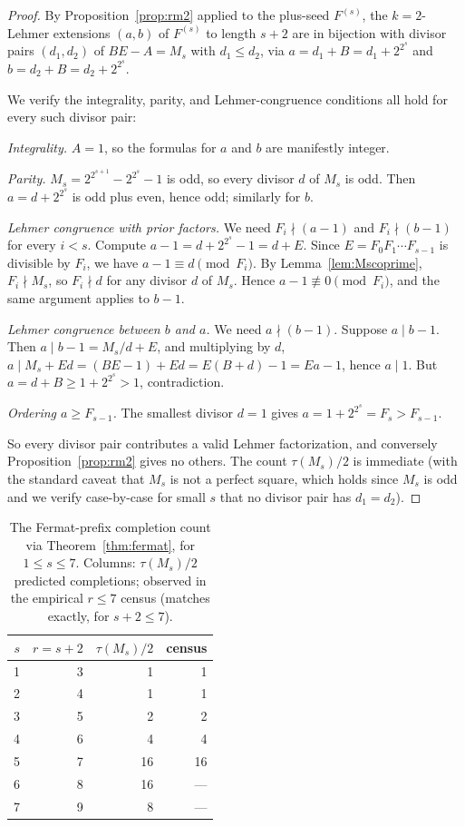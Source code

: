 \documentclass[11pt]{article}
\theoremstyle{definition}
\theoremstyle{remark}
\begin{document}
\begin{proof}
By Proposition~\ref{prop:rm2} applied to the plus-seed $F^{(s)}$, the
$k = 2$-Lehmer extensions $(a, b)$ of $F^{(s)}$ to length $s + 2$ are
in bijection with divisor pairs $(d_1, d_2)$ of $BE - A = M_s$ with
$d_1 \le d_2$, via $a = d_1 + B = d_1 + 2^{2^s}$ and
$b = d_2 + B = d_2 + 2^{2^s}$.

We verify the integrality, parity, and Lehmer-congruence conditions
all hold for every such divisor pair:

\emph{Integrality.}  $A = 1$, so the formulas for $a$ and $b$ are
manifestly integer.

\emph{Parity.}  $M_s = 2^{2^{s+1}} - 2^{2^s} - 1$ is odd, so every
divisor $d$ of $M_s$ is odd.  Then $a = d + 2^{2^s}$ is odd plus
even, hence odd; similarly for $b$.

\emph{Lehmer congruence with prior factors.}  We need $F_i \nmid (a -
1)$ and $F_i \nmid (b - 1)$ for every $i < s$.  Compute
$a - 1 = d + 2^{2^s} - 1 = d + E$.  Since $E = F_0 F_1 \cdots F_{s-1}$
is divisible by $F_i$, we have $a - 1 \equiv d \pmod{F_i}$.  By
Lemma~\ref{lem:Mscoprime}, $F_i \nmid M_s$, so $F_i \nmid d$ for any
divisor $d$ of $M_s$.  Hence $a - 1 \not\equiv 0 \pmod{F_i}$, and
the same argument applies to $b - 1$.

\emph{Lehmer congruence between $b$ and $a$.}  We need $a \nmid (b -
1)$.  Suppose $a \mid b - 1$.  Then $a \mid b - 1 = M_s/d + E$, and
multiplying by $d$, $a \mid M_s + Ed = (BE - 1) + Ed = E(B + d) - 1
= Ea - 1$, hence $a \mid 1$.  But $a = d + B \ge 1 + 2^{2^s} > 1$,
contradiction.

\emph{Ordering $a \ge F_{s-1}$.}  The smallest divisor $d = 1$ gives
$a = 1 + 2^{2^s} = F_s > F_{s-1}$.

So every divisor pair contributes a valid Lehmer factorization, and
conversely Proposition~\ref{prop:rm2} gives no others.  The count
$\tau(M_s)/2$ is immediate (with the standard caveat that $M_s$ is
not a perfect square, which holds since $M_s$ is odd and we verify
case-by-case for small $s$ that no divisor pair has $d_1 = d_2$).
\end{proof}

\begin{table}[ht]
\centering
\caption{The Fermat-prefix completion count via
Theorem~\ref{thm:fermat}, for $1 \le s \le 7$. Columns:
$\tau(M_s) / 2$ predicted completions; observed in the empirical
$r \le 7$ census (matches exactly, for $s + 2 \le 7$).
}\label{tab:fermat-counts}
\smallskip
\begin{tabular}{@{}rrrr@{}}
\toprule
$s$ & $r = s + 2$ & $\tau(M_s)/2$ & census \\
\midrule
1 & 3 & 1  & 1 \\
2 & 4 & 1  & 1 \\
3 & 5 & 2  & 2 \\
4 & 6 & 4  & 4 \\
5 & 7 & 16 & 16 \\
6 & 8 & 16 & --- \\
7 & 9 & 8  & --- \\
\bottomrule
\end{tabular}
\end{table}
\end{document}

